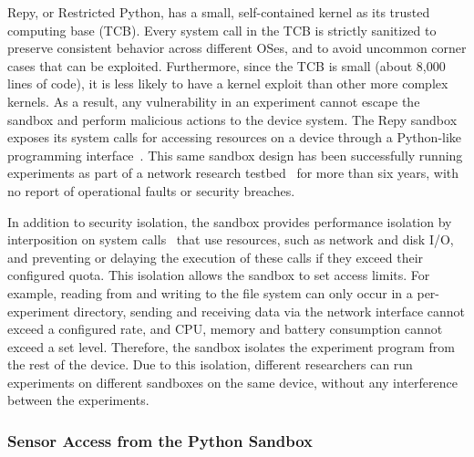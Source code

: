 Repy, or Restricted Python, has a small, self-contained kernel as its trusted 
computing base (TCB). %
Every system call in the TCB is strictly 
sanitized to preserve consistent behavior across different OSes, 
and to avoid uncommon corner cases that can be exploited. 
Furthermore, since the TCB is small (about 8,000 lines of code), it is 
less likely to have a kernel exploit than other more complex kernels. 
As a result, any vulnerability in an experiment 
cannot escape the sandbox and perform malicious actions to 
the device system. The Repy sandbox exposes its system calls for accessing resources on a device
through a Python-like programming interface~\cite{repyv2}. 
This same sandbox design has been successfully running experiments 
as part of a network research testbed~\cite{seattle} for more than six 
years, with no report of operational faults or security breaches. 

In addition to security isolation,
the sandbox provides performance isolation by
interposition on system calls~\cite{garfinkel2003traps} that 
use resources, such as network and disk I/O, and preventing 
or delaying the execution of these calls if they exceed 
their configured quota. 
This isolation allows the sandbox to set access limits. For example, 
reading from and writing to the file system can
only occur in a per-experiment directory, sending and receiving
data via the network interface cannot exceed a configured rate, and
CPU, memory and battery consumption cannot exceed a set level.
Therefore, the sandbox isolates the experiment program from 
the rest of the device. Due to this isolation, different researchers 
can run experiments on different sandboxes on the same device, 
without any interference between the experiments.

\subsubsection{Sensor Access from the Python Sandbox}

